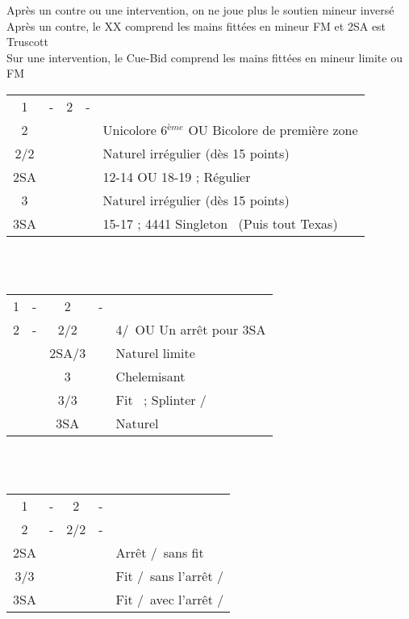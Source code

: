 \documentclass[a4paper, oneside, 11pt]{report}
\begin{document}
		Après un contre ou une intervention, on ne joue plus le soutien mineur inversé\\
		Après un contre, le XX comprend les mains fittées en mineur FM et 2SA est Truscott\\
		Sur une intervention, le Cue-Bid comprend les mains fittées en mineur limite ou FM\\

\newpage
		\begin{tabular}{cccc|l}
		1\carreau & - & 2\trefle & - &\\
		2\carreau &&&& Unicolore 6$^{ème}$ OU Bicolore de première zone\\
		2\coeur/2\pique &&&& Naturel irrégulier (dès 15 points) \\
		2SA &&&& 12-14 OU 18-19 ; Régulier\\
		3\trefle &&&& Naturel irrégulier (dès 15 points)\\
		3SA &&&& 15-17 ; 4441 Singleton \trefle\ (Puis tout Texas)\\
		\end{tabular}\\\\

		\begin{tabular}{cccc|l}
		1\carreau & - & 2\trefle & - &\\
		2\carreau & - & 2\coeur/2\pique && 4\coeur/\pique\ OU Un arrêt pour 3SA\\
		&& 2SA/3\trefle && Naturel limite\\
		&& 3\carreau && Chelemisant \carreau\\
		&& 3\coeur/3\pique && Fit \carreau\ ; Splinter \coeur/\pique\\
		&& 3SA && Naturel\\
		\end{tabular}\\\\

		\begin{tabular}{cccc|l}
		1\carreau & - & 2\trefle & - &\\
		2\carreau & - & 2\coeur/2\pique & - &\\
		2SA &&&& Arrêt \pique/\coeur\ sans fit\\
		3\coeur/3\pique &&&& Fit \coeur/\pique\ sans l'arrêt \pique/\coeur\\
		3SA &&&& Fit \coeur/\pique\ avec l'arrêt \pique/\coeur\\
		\end{tabular}\\\\
\end{document}
